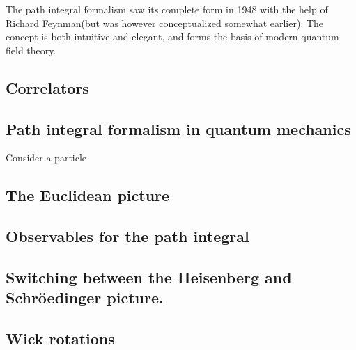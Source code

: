 The path integral formalism saw its complete form in 1948 with the help of Richard Feynman\cite{RevModPhys.20.367}(but was however conceptualized somewhat earlier). The concept is both intuitive and elegant, and forms the basis of modern quantum field theory.

\subsection{Correlators}

\subsection{Path integral formalism in quantum mechanics}
Consider a particle 

\subsection{The Euclidean picture}

\subsection{Observables for the path integral}

\subsection{Switching between the Heisenberg and Schröedinger picture.}

\subsection{Wick rotations}




